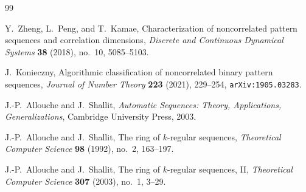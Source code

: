 \documentclass[11pt]{article}
\theoremstyle{definition}
\begin{document}
\begin{thebibliography}{99}

Y.~Zheng, L.~Peng, and T.~Kamae,
\newblock Characterization of noncorrelated pattern sequences and
  correlation dimensions,
\newblock \emph{Discrete and Continuous Dynamical Systems}
  \textbf{38} (2018), no.~10, 5085--5103.

J.~Konieczny,
\newblock Algorithmic classification of noncorrelated binary pattern
  sequences,
\newblock \emph{Journal of Number Theory} \textbf{223} (2021), 229--254,
\newblock \texttt{arXiv:1905.03283}.

J.-P.~Allouche and J.~Shallit,
\newblock \emph{Automatic Sequences: Theory, Applications,
  Generalizations},
\newblock Cambridge University Press, 2003.

J.-P.~Allouche and J.~Shallit,
\newblock The ring of $k$-regular sequences,
\newblock \emph{Theoretical Computer Science} \textbf{98} (1992),
  no.~2, 163--197.

J.-P.~Allouche and J.~Shallit,
\newblock The ring of $k$-regular sequences, {II},
\newblock \emph{Theoretical Computer Science} \textbf{307} (2003),
  no.~1, 3--29.

\end{thebibliography}
\end{document}
